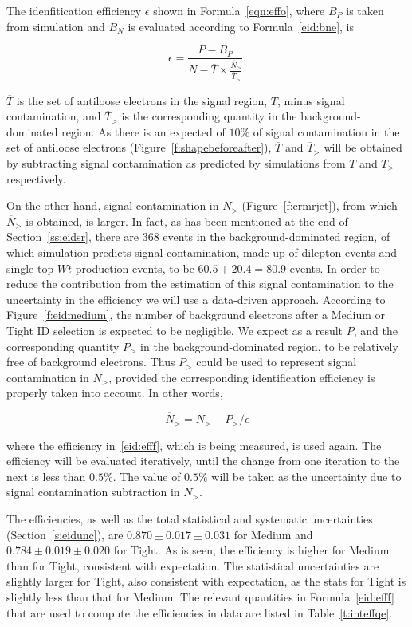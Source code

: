 The idenfitication efficiency $\epsilon$ shown in Formula~\ref{eqn:effo}, where
$B_P$ is taken from simulation and $B_N$ is evaluated according to
Formula~\ref{eid:bne}, is


\begin{equation}\label{eid:efff}
	\epsilon = \frac{P-B_P}{N - \overline{T} \times \frac{\overline{N}_>}{\overline{T}_>}}.
\end{equation}


$\overline{T}$ is the set of antiloose electrons in the signal region, $T$,
minus signal contamination, and $\overline{T}_>$ is the corresponding quantity
in the background-dominated region. As there is an expected of $10\%$ of signal
contamination in the set of antiloose electrons
(Figure~\ref{f:shapebeforeafter}), $\overline{T}$ and $\overline{T}_>$ will be
obtained by subtracting signal contamination as predicted by simulations from
$T$ and $T_>$ respectively.

On the other hand, signal contamination in $N_>$ (Figure~\ref{f:crmrjet}), from
which $\overline{N}_>$ is obtained, is larger. In fact, as has been mentioned
at the end of Section~\ref{ss:eidsr}, there are $368$ events in the
background-dominated region, of which simulation predicts signal contamination,
made up of dilepton events and single top $Wt$ production events, to be $60.5 +
20.4 = 80.9$ events. In order to reduce the contribution from the estimation of
this signal contamination to the uncertainty in the efficiency we will use a
data-driven approach. According to Figure~\ref{f:eidmedium}, the number of
background electrons after a Medium or Tight ID selection is expected to be
negligible. We expect as a result $P$, and the corresponding quantity $P_>$ in
the background-dominated region, to be relatively free of background electrons.
Thus $P_>$ could be used to represent signal contamination in $N_>$, provided
the corresponding identification efficiency is properly taken into account. In
other words,

%
$$\overline{N}_> = N_> - P_> / \epsilon $$
%

where the efficiency in~\ref{eid:efff}, which is being measured, is used again.
The efficiency will be evaluated iteratively, until the change from one
iteration to the next is less than $0.5\%$. The value of $0.5\%$ will be taken
as the uncertainty due to signal contamination subtraction in $N_>$.

The efficiencies, as well as the total statistical and systematic uncertainties
(Section~\ref{s:eidunc}), are $\mathbf{0.870\pm 0.017 \pm 0.031}$ for Medium
and $\mathbf{0.784 \pm 0.019 \pm 0.020}$ for Tight. As is seen, the efficiency
is higher for Medium than for Tight, consistent with expectation. The
statistical uncertainties are slightly larger for Tight, also consistent with
expectation, as the stats for Tight is slightly less than that for Medium. The
relevant quantities in Formula~\ref{eid:efff} that are used to compute the
efficiencies in data are listed in Table~\ref{t:inteffqe}.

